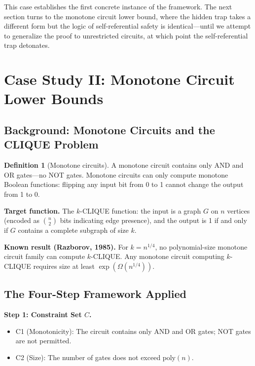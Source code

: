 \documentclass[11pt,a4paper]{article}
\theoremstyle{plain}
\theoremstyle{definition}
\newtheorem{definition}[theorem]{Definition}
\theoremstyle{remark}
\begin{document}
This case establishes the first concrete instance of the framework. The next section turns to the monotone circuit lower bound, where the hidden trap takes a different form but the logic of self-referential safety is identical---until we attempt to generalize the proof to unrestricted circuits, at which point the self-referential trap detonates.

\section{Case Study II: Monotone Circuit Lower Bounds}
\label{sec:monotone}

\subsection{Background: Monotone Circuits and the CLIQUE Problem}

\begin{definition}[Monotone circuits]
A monotone circuit contains only AND and OR gates---no NOT gates. Monotone circuits can only compute monotone Boolean functions: flipping any input bit from 0 to 1 cannot change the output from 1 to 0.
\end{definition}

\textbf{Target function.} The $k$-CLIQUE function: the input is a graph $G$ on $n$ vertices (encoded as $\binom{n}{2}$ bits indicating edge presence), and the output is 1 if and only if $G$ contains a complete subgraph of size $k$.

\textbf{Known result (Razborov, 1985).} For $k = n^{1/4}$, no polynomial-size monotone circuit family can compute $k$-CLIQUE. Any monotone circuit computing $k$-CLIQUE requires size at least $\exp(\Omega(n^{1/4}))$.

\subsection{The Four-Step Framework Applied}

\textbf{Step 1: Constraint Set $C$.}
\begin{itemize}
\item C1 (Monotonicity): The circuit contains only AND and OR gates; NOT gates are not permitted.
\item C2 (Size): The number of gates does not exceed $\mathrm{poly}(n)$.
\end{itemize}
\end{document}
